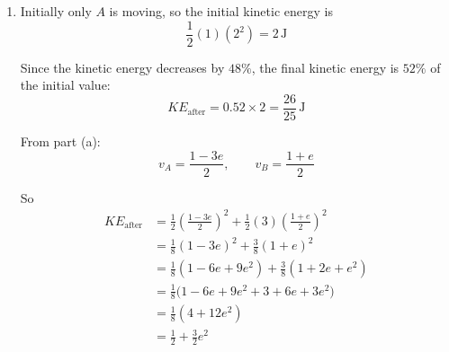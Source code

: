 \documentclass[leqno]{article}
\begin{document}
\begin{enumerate}[
  label=\textbf{\arabic*.},
  leftmargin=*,
  topsep=0pt,
  partopsep=0pt,
  parsep=0pt
]
\begin{djsSolution}
\begin{enumerate}[label=\textbf{(\alph*)}]
  Conservation of momentum gives
  \[
  1(2)+3(0)=1v_A+3v_B
  \]

  so
  \[
  2=v_A+3v_B
  \]

  The coefficient of restitution is
  \[
  e=\frac{\text{speed of separation}}{\text{speed of approach}}
  \]

  Hence
  \[
  v_B-v_A=e(2-0)=2e
  \]

  So
  \[
  v_B=v_A+2e
  \]

  Substituting into the momentum equation:
  \begin{align*}
  2&=v_A+3(v_A+2e)\\
  2&=4v_A+6e\\
  4v_A&=2-6e\\
  v_A&=\frac{1-3e}{2}
  \end{align*}

  This shows that the velocity of $A$ after the collision is
  \[
  \frac{1}{2}(1-3e)\,\mathrm{m}\,\mathrm{s}^{-1}
  \]

  Then
  \begin{align*}
  v_B&=v_A+2e\\
  &=\frac{1-3e}{2}+2e\\
  &=\frac{1+e}{2}
  \end{align*}

  So the velocity of $B$ is
  \[
  \frac{1+e}{2}\,\mathrm{m}\,\mathrm{s}^{-1}
  \]

  \item Initially only $A$ is moving, so the initial kinetic energy is
  \[
  \frac12(1)(2^2)=2\,\mathrm{J}
  \]

  Since the kinetic energy decreases by $48\%$, the final kinetic energy is $52\%$ of the initial value:
  \[
  KE_{\text{after}}=0.52\times 2=\frac{26}{25}\,\mathrm{J}
  \]

  From part (a):
  \[
  v_A=\frac{1-3e}{2},\qquad v_B=\frac{1+e}{2}
  \]

  So
  \begin{align*}
  KE_{\text{after}}
  &=\frac12\left(\frac{1-3e}{2}\right)^2+\frac12(3)\left(\frac{1+e}{2}\right)^2\\
  &=\frac18(1-3e)^2+\frac38(1+e)^2\\
  &=\frac18(1-6e+9e^2)+\frac38(1+2e+e^2)\\
  &=\frac18\bigl(1-6e+9e^2+3+6e+3e^2\bigr)\\
  &=\frac18(4+12e^2)\\
  &=\frac12+\frac32e^2
  \end{align*}


\end{enumerate}
\end{djsSolution}
\end{enumerate}
\end{document}
